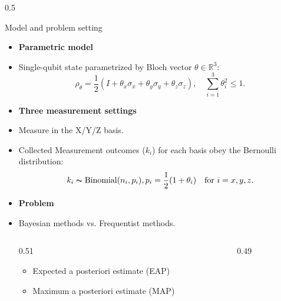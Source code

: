 \documentclass[dvipdfmx]{beamer}
\begin{document}
\begin{frame}[fragile]
\begin{columns}[t]
\begin{column}{0.5\linewidth}
        \begin{mybox}{Model and problem setting}
            \begin{itemize}
                \item \textbf{Parametric model}
                    \item[]  Single-qubit state parametrized by Bloch vector $\theta\in \mathbb{R}^3$:
                    \begin{equation}
                        \rho_\theta=\frac{1}{2}\left(I+\theta_x\sigma_x+\theta_y\sigma_y+\theta_z\sigma_z\right),\quad \sum_{i=1}^{3}\theta_i^2\leq1.
                    \end{equation}
                \item \textbf{Three measurement settings}  
                \item[] Measure in the X/Y/Z basis.
                \item[] Collected Measurement outcomes ($k_i$) for each basis obey the Bernoulli distribution:
                \begin{equation}
                    k_i \thicksim \mathrm{Binomial}(n_i,p_i), p_i=\frac{1}{2}(1+\theta_i) \quad \text{for } i=x,y,z.
                \end{equation}
                \item \textbf{Problem}
                \item [] Bayesian methods vs. Frequentist methods.
        \begin{columns}
            \begin{column}{0.51\linewidth}
                \begin{itemize}
                    \item [] Expected a posteriori estimate (EAP)
                    \item [] Maximum a posteriori estimate (MAP)
                \end{itemize}
            \end{column}
            \begin{column}{0.49\linewidth}
                \begin{itemize}


\end{itemize}
\end{column}
\end{columns}
\end{itemize}
\end{mybox}
\end{column}
\end{columns}
\end{frame}
\end{document}
